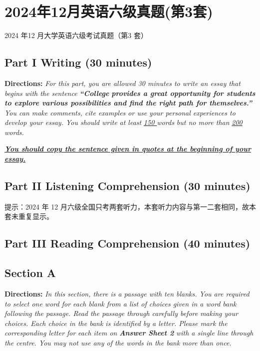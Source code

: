 \documentclass[UTF8,11pt]{ctexart}
\begin{document}
\section*{2024年12月英语六级真题(第3套)}
2024 年12 月大学英语六级考试真题（第3 套）


\subsection*{\textbf{Part I Writing} \textbf{(30 minutes)}}


\textbf{Directions:}\textit{ For this part, you are allowed 30 minutes to write an essay that begins with the sentence }\textbf{\textit{“College}} \textbf{\textit{provides a great opportunity for students to explore various possibilities and find the right path for themselves.”}} \textit{You can make comments, cite examples or use your personal experiences to develop your essay. You should write} \textit{at least }\textit{\uline{150 }}\textit{words but no more than }\textit{\uline{200 }}\textit{words.}


\textbf{\textit{\uline{You should copy the sentence given in quotes at the beginning of your essay.}}}


\subsection*{\textbf{Part II} \textbf{Listening Comprehension} \textbf{(30 minutes)}}


提示：2024 年 12 月六级全国只考两套听力，本套听力内容与第一二套相同，故本套未重复显示。


\subsection*{\textbf{Part III Reading Comprehension (40 minutes)}}


\subsection*{\textbf{Section A}}


\textbf{Directions:} \textit{In this section, there is a passage with ten blanks. You are required to select one word for each blank} \textit{from a list of choices given in a word bank following the passage. Read the passage through carefully before} \textit{making your choices. Each choice in the bank is identified by a letter. Please mark the corresponding letter for} \textit{each item on }\textbf{\textit{Answer Sheet 2}}\textit{ with a single line through the centre. You may not use any of the words in the bank} \textit{more than once.}
\end{document}
